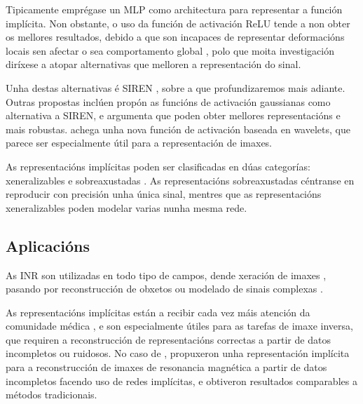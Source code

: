 Tipicamente emprégase un MLP como architectura para representar a función implícita. Non obstante, o uso da función de activación ReLU tende a non obter os mellores resultados, debido a que son incapaces de representar deformacións locais sen afectar o sea comportamento global \cite{rahaman2019spectralbiasneuralnetworks},
polo que moita investigación diríxese a atopar alternativas que melloren a representación do sinal. \cite{essakine2024standimplicitneuralrepresentations}

Unha destas alternativas é SIREN \cite{sitzmann2020implicitneuralrepresentationsperiodic}, sobre a que profundizaremos mais adiante.
Outras propostas inclúen \cite{ramasinghe2022periodicityunifyingframeworkactivations} propón as funcións de activación gaussianas como alternativa a SIREN, e argumenta que poden obter mellores representacións e mais robustas.
\cite{saragadam2023wirewaveletimplicitneural} achega unha nova función de activación baseada en wavelets, que parece ser especialmente útil para a representación de imaxes.

As representacións implícitas poden ser clasificadas en dúas categorías: xeneralizables e sobreaxustadas \cite{yu2024neuraltrajectorymodelimplicit}. 
As representacións sobreaxustadas céntranse en reproducir con precisión unha única sinal, mentres que as representacións xeneralizables poden modelar varias nunha mesma rede.

\subsection{Aplicacións}
\label{subsec:Aplicacións}

As INR son utilizadas en todo tipo de campos, dende xeración de imaxes \cite{reddy2022multiimplicitneuralrepresentationfonts}, pasando por
reconstrucción de obxetos \cite{mildenhall2020nerfrepresentingscenesneural} \cite{mescheder2019occupancynetworkslearning3d} ou modelado de sinais complexas \cite{wu2021iremhighresolutionmagneticresonance}.

As representacións implícitas están a recibir cada vez máis atención da comunidade médica \cite{molaei2023implicitneuralrepresentationmedical}, e son 
especialmente útiles para as tarefas de imaxe inversa, que requiren a reconstrucción de representacións correctas a partir de datos incompletos ou ruidosos. 
No caso de \cite{shen2023nerpimplicitneuralrepresentation}, propuxeron unha representación implícita para a reconstrucción de imaxes de resonancia magnética a partir de datos incompletos facendo uso de redes implícitas, 
e obtiveron resultados comparables a métodos tradicionais.

